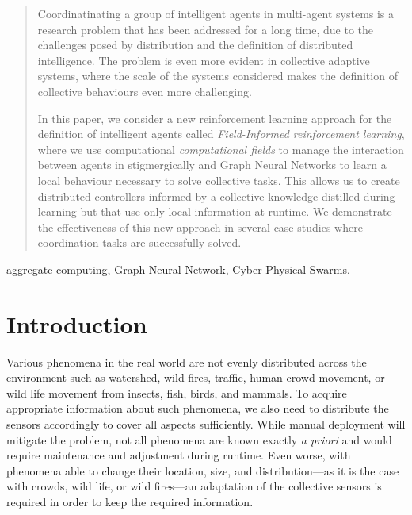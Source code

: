 \documentclass[conference]{IEEEtran}
\begin{document}
\begin{abstract}
Coordinatinating a group of intelligent agents in multi-agent systems 
 is a research problem that has been addressed for a long time, 
 due to the challenges posed by distribution and the definition of distributed intelligence. 
%
The problem is even more evident in collective adaptive systems, 
 where the scale of the systems considered makes the definition of collective behaviours even more challenging. 

In this paper, we consider a new reinforcement learning approach 
  for the definition of intelligent agents called \emph{Field-Informed reinforcement learning}, 
  where we use computational \emph{computational fields} to manage the interaction between agents 
  in stigmergically and Graph Neural Networks to learn a local behaviour necessary to solve collective tasks. 
%
This allows us to create distributed controllers informed by a collective knowledge 
 distilled during learning but that use only local information at runtime.
% 
We demonstrate the effectiveness of this new approach in several case studies 
 where coordination tasks are successfully solved.  
\end{abstract}

\begin{IEEEkeywords}
aggregate computing, Graph Neural Network, Cyber-Physical Swarms.
\end{IEEEkeywords}
%
\section{Introduction}
Various phenomena in the real world are not evenly distributed across the environment such as watershed, wild fires, traffic, human crowd movement, or wild life movement from insects, fish, birds, and mammals.
To acquire appropriate information about such phenomena, we also need to distribute the sensors accordingly to cover all aspects sufficiently. While manual deployment will mitigate the problem, not all phenomena are known exactly \emph{a priori} and would require maintenance and adjustment during runtime. Even worse, with phenomena able to change their location, size, and distribution---as it is the case with crowds, wild life, or wild fires---an adaptation of the collective sensors is required in order to keep the required information. 
\end{document}
